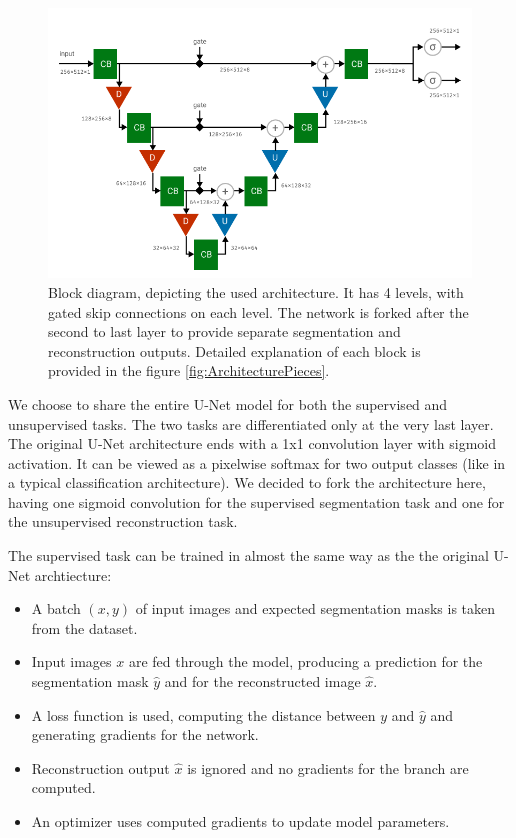 \begin{figure}[ht]
    \centering
    \includegraphics[width=140mm]{../img/architecture-complete.pdf}
    \caption{Block diagram, depicting the used architecture. It has 4 levels, with gated skip connections on each level. The network is forked after the second to last layer to provide separate segmentation and reconstruction outputs. Detailed explanation of each block is provided in the figure \ref{fig:ArchitecturePieces}.}
    \label{fig:ArchitectureCombined}
\end{figure}

We choose to share the entire U-Net model for both the supervised and unsupervised tasks. The two tasks are differentiated only at the very last layer. The original U-Net architecture ends with a 1x1 convolution layer with sigmoid activation. It can be viewed as a pixelwise softmax for two output classes (like in a typical classification architecture). We decided to fork the architecture here, having one sigmoid convolution for the supervised segmentation task and one for the unsupervised reconstruction task.

The supervised task can be trained in almost the same way as the the original U-Net archtiecture:

\begin{itemize}
    \item A batch $(x, y)$ of input images and expected segmentation masks is taken from the dataset.
    \item Input images $x$ are fed through the model, producing a prediction for the segmentation mask $\hat{y}$ and for the reconstructed image $\hat{x}$.
    \item A loss function is used, computing the distance between $y$ and $\hat{y}$ and generating gradients for the network.
    \item Reconstruction output $\hat{x}$ is ignored and no gradients for the branch are computed.
    \item An optimizer uses computed gradients to update model parameters.
\end{itemize}

